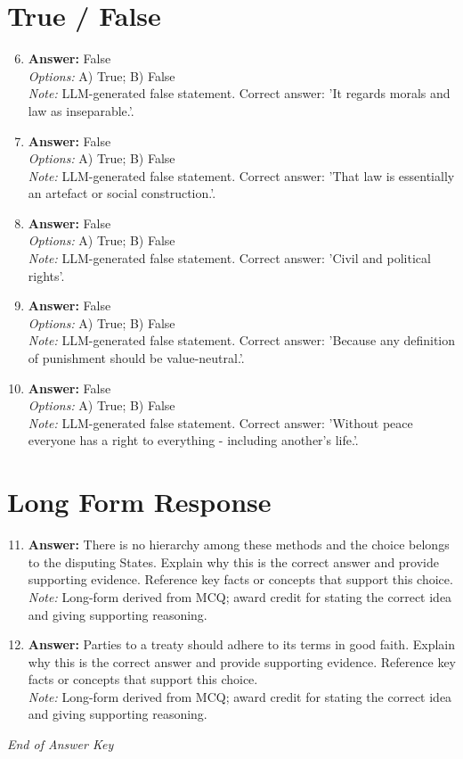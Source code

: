 \documentclass[12pt]{article}
\begin{document}
\section*{True / False}
\begin{enumerate}[label=\arabic*.]
\setcounter{enumi}{5}
\item \textbf{Answer:} False
\\ \textit{Options:} A) True; B) False
\\ \textit{Note:} LLM-generated false statement. Correct answer: 'It regards morals and law as inseparable.'.
\item \textbf{Answer:} False
\\ \textit{Options:} A) True; B) False
\\ \textit{Note:} LLM-generated false statement. Correct answer: 'That law is essentially an artefact or social construction.'.
\item \textbf{Answer:} False
\\ \textit{Options:} A) True; B) False
\\ \textit{Note:} LLM-generated false statement. Correct answer: 'Civil and political rights'.
\item \textbf{Answer:} False
\\ \textit{Options:} A) True; B) False
\\ \textit{Note:} LLM-generated false statement. Correct answer: 'Because any definition of punishment should be value-neutral.'.
\item \textbf{Answer:} False
\\ \textit{Options:} A) True; B) False
\\ \textit{Note:} LLM-generated false statement. Correct answer: 'Without peace everyone has a right to everything - including another's life.'.
\end{enumerate}

\section*{Long Form Response}
\begin{enumerate}[label=\arabic*.]
\setcounter{enumi}{10}
\item \textbf{Answer:} There is no hierarchy among these methods and the choice belongs to the disputing States. Explain why this is the correct answer and provide supporting evidence. Reference key facts or concepts that support this choice.
\\ \textit{Note:} Long-form derived from MCQ; award credit for stating the correct idea and giving supporting reasoning.
\item \textbf{Answer:} Parties to a treaty should adhere to its terms in good faith. Explain why this is the correct answer and provide supporting evidence. Reference key facts or concepts that support this choice.
\\ \textit{Note:} Long-form derived from MCQ; award credit for stating the correct idea and giving supporting reasoning.
\end{enumerate}

\vfill
\noindent\textit{End of Answer Key}
\end{document}
